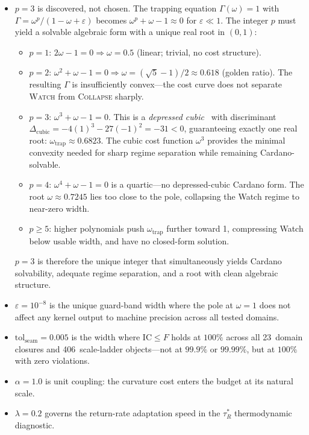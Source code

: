 \documentclass[
  aps,
  prd,
  twocolumn,
  superscriptaddress,
  nofootinbib,
  floatfix
]{revtex4-2}
\newcommand{\tRS}{\tau_{\!R}^{*}}
\newcommand{\Gam}{\Gamma}
\newcommand{\eps}{\varepsilon}
\newcommand{\tolseam}{\mathrm{tol}_{\mathrm{seam}}}
\newcommand{\regime}[1]{\textrm{\upshape\scshape#1}}
\newcommand{\IC}{\mathrm{IC}}
\begin{document}
\begin{itemize}[leftmargin=*]
\item $p = 3$ is discovered, not chosen.  The trapping equation
  $\Gam(\omega) = 1$ with $\Gam = \omega^p/(1 - \omega + \eps)$
  becomes $\omega^p + \omega - 1 \approx 0$ for $\eps \ll 1$.
  The integer $p$ must yield a solvable algebraic form with a
  unique real root in $(0,1)$:
  \begin{itemize}[leftmargin=*]
  \item $p = 1$: $2\omega - 1 = 0 \Rightarrow \omega = 0.5$
    (linear; trivial, no cost structure).
  \item $p = 2$: $\omega^2 + \omega - 1 = 0 \Rightarrow
    \omega = (\sqrt{5}-1)/2 \approx 0.618$ (golden ratio).
    The resulting $\Gam$ is insufficiently convex---the cost
    curve does not separate \regime{Watch} from \regime{Collapse}
    sharply.
  \item $p = 3$: $\omega^3 + \omega - 1 = 0$.  This is a
    \emph{depressed cubic}~\cite{cardano1545} with discriminant
    $\Delta_{\mathrm{cubic}} = -4(1)^3 - 27(-1)^2 = -31 < 0$,
    guaranteeing exactly one real root:
    $\omega_{\mathrm{trap}} \approx 0.6823$.
    The cubic cost function $\omega^3$ provides the minimal
    convexity needed for sharp regime separation while remaining
    Cardano-solvable.
  \item $p = 4$: $\omega^4 + \omega - 1 = 0$ is a quartic---no
    depressed-cubic Cardano form.  The root
    $\omega \approx 0.7245$ lies too close to the pole,
    collapsing the Watch regime to near-zero width.
  \item $p \geq 5$: higher polynomials push $\omega_\mathrm{trap}$
    further toward 1, compressing Watch below usable width,
    and have no closed-form solution.
  \end{itemize}
  $p = 3$ is therefore the unique integer that simultaneously
  yields Cardano solvability, adequate regime separation, and
  a root with clean algebraic structure.

\item $\eps = 10^{-8}$ is the unique guard-band width where the
  pole at $\omega = 1$ does not affect any kernel output to machine
  precision across all tested domains.

\item $\tolseam = 0.005$ is the width where $\IC \leq F$ holds at
  $100\%$ across all 23~domain closures and 406~scale-ladder
  objects---not at $99.9\%$ or $99.99\%$, but at $100\%$ with zero
  violations.

\item $\alpha = 1.0$ is unit coupling: the curvature cost
  enters the budget at its natural scale.

\item $\lambda = 0.2$ governs the return-rate adaptation speed in
  the $\tRS$ thermodynamic diagnostic.
\end{itemize}
\end{document}
